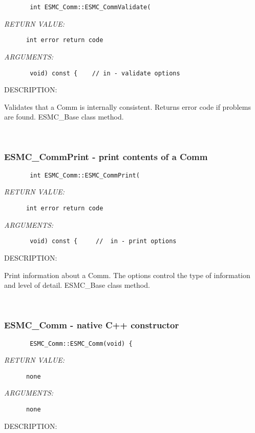   
\begin{verbatim}       int ESMC_Comm::ESMC_CommValidate(\end{verbatim}{\em RETURN VALUE:}
\begin{verbatim}      int error return code\end{verbatim}{\em ARGUMENTS:}
\begin{verbatim}       void) const {    // in - validate options\end{verbatim}
{\sf DESCRIPTION:\\ }


        Validates that a Comm is internally consistent.
        Returns error code if problems are found.  ESMC\_Base class method.
   
 
\mbox{}\hrulefill\ 
 
\subsubsection{ESMC\_CommPrint - print contents of a Comm}


  
\begin{verbatim}       int ESMC_Comm::ESMC_CommPrint(\end{verbatim}{\em RETURN VALUE:}
\begin{verbatim}      int error return code\end{verbatim}{\em ARGUMENTS:}
\begin{verbatim}       void) const {     //  in - print options\end{verbatim}
{\sf DESCRIPTION:\\ }


        Print information about a Comm.  The options control the
        type of information and level of detail.  ESMC\_Base class method.
   
 
\mbox{}\hrulefill\ 
 
\subsubsection{ESMC\_Comm - native C++ constructor}


  
\begin{verbatim}       ESMC_Comm::ESMC_Comm(void) {\end{verbatim}{\em RETURN VALUE:}
\begin{verbatim}      none\end{verbatim}{\em ARGUMENTS:}
\begin{verbatim}      none\end{verbatim}
{\sf DESCRIPTION:\\ }



